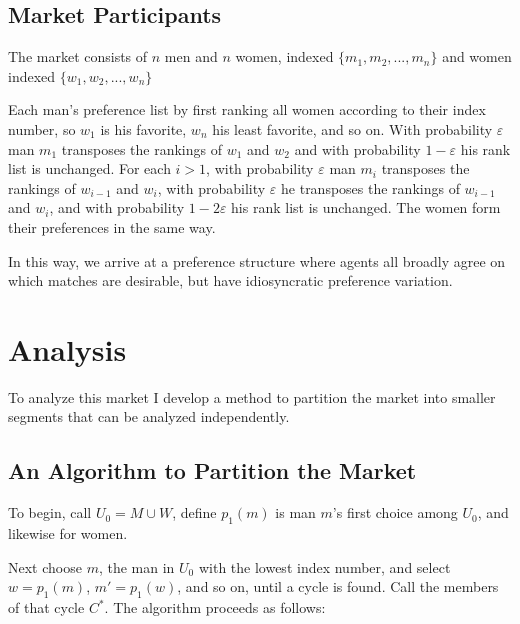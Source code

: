 \documentclass[WP]{AEA}
\begin{document}
\subsection{Market Participants}

The market consists of $n$ men and $n$ women,  indexed $\{ m_1, m_2, ... ,m_n\}$ and women indexed $\{ w_1, w_2, ... ,w_n\}$
	
Each man's preference list by first ranking all women according to their index number, so $w_1$ is his favorite, $w_n$ his least favorite, and so on.  
With probability $\varepsilon$ man $m_1$ transposes the rankings of $w_{1}$ and $w_2$ and with probability $1-\varepsilon$ his rank list is unchanged.  For each $i > 1$, with probability $\varepsilon$ man $m_i$ transposes the rankings of $w_{i-1}$ and $w_i$, with probability $\varepsilon$ he transposes the rankings of $w_{i-1}$ and $w_i$, and with probability $1-2\varepsilon$ his rank list is unchanged.
The women form their preferences in the same way.

In this way, we arrive at a preference structure where agents all broadly agree on which matches are desirable, but have idiosyncratic preference variation.
	


	
\section{Analysis}

To analyze this market I develop a method to partition the market into smaller segments that can be analyzed independently.


\subsection{An Algorithm to Partition the Market} \label{subsect:partition}

To begin, call $U_0 = M \cup W$, define $p_1(m)$ is man $m$'s first choice among $U_0$, and likewise for women.

Next choose $m$, the man in $U_0$ with the lowest index number, and select $w = p_1(m)$, $m' = p_1(w)$, and so on, until a cycle is found. Call the members of that cycle $C^*$.  The algorithm proceeds as follows: 
\end{document}
